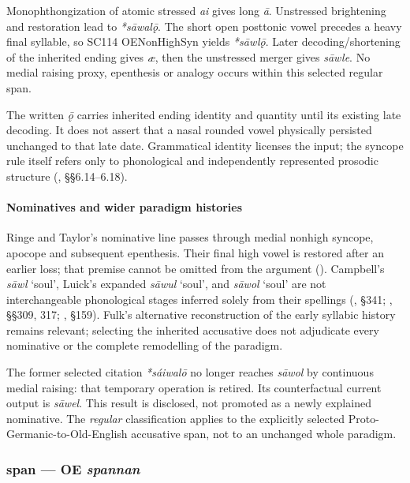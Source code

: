 \documentclass[
  british,
  a4paper,
]{article}
\providecommand{\Recon}[1]{\emph{*#1}}
\begin{document}
Monophthongization of atomic stressed \emph{ai} gives long \emph{ā}.
Unstressed brightening and restoration lead to \Recon{sāwalǭ}. The short
open posttonic vowel precedes a heavy final syllable, so SC114
OENonHighSyn yields \Recon{sāwlǭ}. Later decoding/shortening of the
inherited ending gives \emph{æ}, then the unstressed merger gives
{\emph{sāwle}}. No medial raising proxy, epenthesis or analogy occurs
within this selected regular span.

The written \emph{ǭ} carries inherited ending identity and quantity
until its existing late decoding. It does not assert that a nasal
rounded vowel physically persisted unchanged to that late date.
Grammatical identity licenses the input; the syncope rule itself refers
only to phonological and independently represented prosodic structure
(, §§6.14--6.18).

\paragraph{Nominatives and wider paradigm
histories}\label{nominatives-and-wider-paradigm-histories}

Ringe and Taylor's nominative line passes through medial nonhigh
syncope, apocope and subsequent epenthesis. Their final high vowel is
restored after an earlier loss; that premise cannot be omitted from the
argument (). Campbell's {\emph{sāwl}} `soul', Luick's expanded {\emph{sāwul}}
`soul', and {\emph{sāwol}} `soul' are not interchangeable phonological
stages inferred solely from their spellings
(, §341;
, §§309, 317;
, §159). Fulk's
alternative reconstruction of the early syllabic history remains
relevant; selecting the inherited accusative does not adjudicate every
nominative or the complete remodelling of the paradigm.

The former selected citation \Recon{sáiwalō} no longer reaches
\emph{sāwol} by continuous medial raising: that temporary operation is
retired. Its counterfactual current output is \emph{sāwel}. This result
is disclosed, not promoted as a newly explained nominative. The
\emph{regular} classification applies to the explicitly selected
Proto-Germanic-to-Old-English accusative span, not to an unchanged whole
paradigm.

\subsubsection{\texorpdfstring{span --- OE
\emph{spannan}}{span --- OE spannan}}\label{span-oe-spannan}
\end{document}
